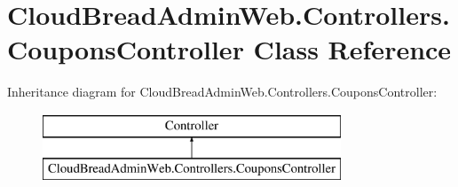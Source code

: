 \hypertarget{class_cloud_bread_admin_web_1_1_controllers_1_1_coupons_controller}{}\section{Cloud\+Bread\+Admin\+Web.\+Controllers.\+Coupons\+Controller Class Reference}
\label{class_cloud_bread_admin_web_1_1_controllers_1_1_coupons_controller}
Inheritance diagram for Cloud\+Bread\+Admin\+Web.\+Controllers.\+Coupons\+Controller\+:\begin{figure}[H]
\begin{center}
\leavevmode
\includegraphics[height=2.000000cm]{class_cloud_bread_admin_web_1_1_controllers_1_1_coupons_controller}
\end{center}
\end{figure}
